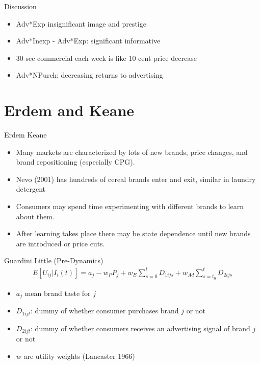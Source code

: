 \documentclass[xcolor=pdftex,dvipsnames,table,mathserif,aspectratio=169]{beamer}
\begin{document}
\begin{frame}{Discussion}
\begin{itemize}
\item Adv*Exp \alert{insignificant} image and prestige
\item Adv*Inexp - Adv*Exp: \alert{significant} informative
\item 30-sec commercial each week is like 10 cent price decrease
\item Adv*NPurch: decreasing returns to advertising
\end{itemize}
\end{frame}

\section*{Erdem and Keane}

\begin{frame}{Erdem Keane}
\begin{itemize}
\item Many markets are characterized by lots of new brands, price changes, and brand repositioning (especially CPG).
\item Nevo (2001) has hundreds of cereal brands enter and exit, similar in laundry detergent
\item Consumers may spend time experimenting with different brands to learn about them.
\item After learning takes place there may be state dependence until new brands are introduced or price cuts.
\end{itemize}
\end{frame} 

\begin{frame}{Guardini Little (Pre-Dynamics)}
\begin{eqnarray*}
E[U_{ij} | I_i(t) ] = a_j -w_P P_j + w_E \sum_{s=0}^t D_{1ijs}  + w_{Ad} \sum_{s=t_0}^t D_{2ijs}
\end{eqnarray*}
\begin{itemize}
\item $a_j$ mean brand taste for $j$
\item $D_{1ijt}$: dummy of whether consumer purchases brand $j$ or not
\item $D_{2ijt}$: dummy of whether consumers receives an advertising signal of brand $j$ or not
\item $w$ are utility weights (Lancaster 1966)
\end{itemize}
\end{frame} 
\end{document}
